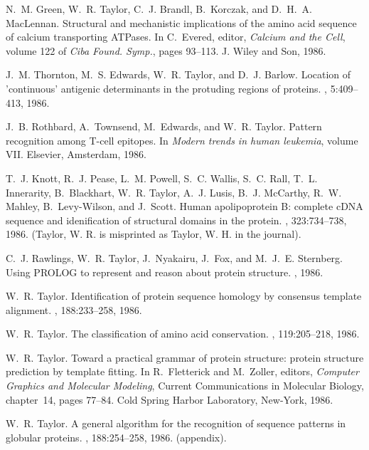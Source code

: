 \begin{thebibliography}{100}
N.~M. Green, W.~R. Taylor, C.~J. Brandl, B.~Korczak, and D.~H.~A. MacLennan.
\newblock Structural and mechanistic implications of the amino acid sequence of
  calcium transporting {ATP}ases.
\newblock In C.~Evered, editor, {\em Calcium and the Cell}, volume 122 of {\em
  Ciba Found. Symp.}, pages 93--113. J. Wiley and Son, 1986.

J.~M. Thornton, M.~S. Edwards, W.~R. Taylor, and D.~J. Barlow.
\newblock Location of 'continuous' antigenic determinants in the protuding
  regions of proteins.
, 5:409--413, 1986.

J.~B. Rothbard, A.~Townsend, M.~Edwards, and W.~R. Taylor.
\newblock Pattern recognition among {T}-cell epitopes.
\newblock In {\em Modern trends in human leukemia}, volume VII. Elsevier,
  Amsterdam, 1986.

T.~J. Knott, R.~J. Pease, L.~M. Powell, S.~C. Wallis, S.~C. Rall, T.~L.
  Innerarity, B.~Blackhart, W.~R. Taylor, A.~J. Lusis, B.~J. McCarthy, R.~W.
  Mahley, B.~Levy-Wilson, and J.~Scott.
\newblock Human apolipoprotein {B}: complete c{DNA} sequence and idenification
  of structural domains in the protein.
, 323:734--738, 1986.
\newblock (Taylor, W. R. is misprinted as Taylor, W. H. in the journal).

C.~J. Rawlings, W.~R. Taylor, J.~Nyakairu, J.~Fox, and M.~J.~E. Sternberg.
\newblock Using {PROLOG} to represent and reason about protein structure.
, 1986.

W.~R. Taylor.
\newblock Identification of protein sequence homology by consensus template
  alignment.
, 188:233--258, 1986.

W.~R. Taylor.
\newblock The classification of amino acid conservation.
, 119:205--218, 1986.

W.~R. Taylor.
\newblock Toward a practical grammar of protein structure: protein structure
  prediction by template fitting.
\newblock In R.~Fletterick and M.~Zoller, editors, {\em Computer Graphics and
  Molecular Modeling}, Current Communications in Molecular Biology, chapter~14,
  pages 77--84. Cold Spring Harbor Laboratory, New-York, 1986.

W.~R. Taylor.
\newblock A general algorithm for the recognition of sequence patterns in
  globular proteins.
, 188:254--258, 1986.
\newblock (appendix).


\end{thebibliography}
